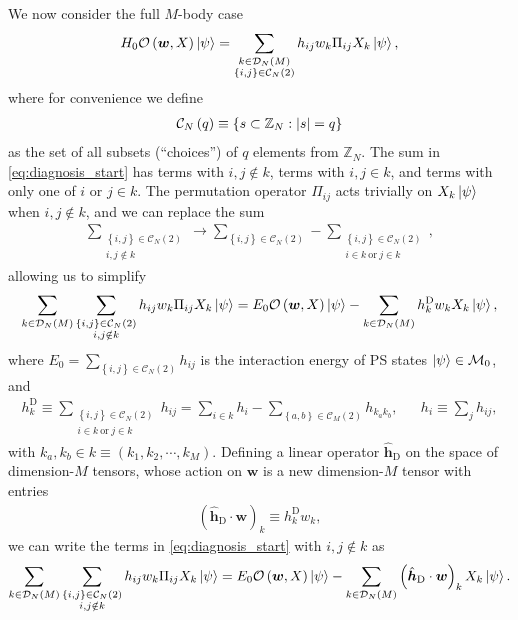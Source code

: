 \documentclass[nofootinbib,notitlepage,11pt]{revtex4-2}
\renewcommand{\t}{\text} %
\newcommand{\p}[1]{\left(#1\right)} %
\renewcommand{\set}[1]{\left\{#1\right\}} %
\renewcommand{\c}{\cdot} %
\newcommand{\m}{\bm} %
\newcommand{\1}{\mathds{1}}
\renewcommand{\i}{\mathrm{i}\mkern1mu}
\newcommand{\C}{\mathcal{C}}
\newcommand{\D}{\mathcal{D}}
\newcommand{\M}{\mathcal{M}}
\renewcommand{\O}{\mathcal{O}}
\newcommand{\ZZ}{\mathbb{Z}}
\begin{document}
We now consider the full $M$-body case
\begin{align}
  H_0 \O\p{\m w,X} \ket\psi
  = \sum_{\substack{k\in\D_N\p{M}\\\set{i,j}\in\C_N\p{2}}}
  h_{ij} w_k \Pi_{ij} X_k \ket\psi,
  \label{eq:diagnosis_start}
\end{align}
where for convenience we define
\begin{align}
  \C_N\p{q} \equiv \set{ s \subset \ZZ_N : \abs{s} = q }
  \label{eq:choices}
\end{align}
as the set of all subsets (``choices'') of $q$ elements from $\ZZ_N$.
The sum in \eqref{eq:diagnosis_start} has terms with $i,j\notin k$,
terms with $i,j\in k$, and terms with only one of $i$ or $j\in k$.
The permutation operator $\Pi_{ij}$ acts trivially on $X_k\ket\psi$
when $i,j\notin k$, and we can replace the sum
\begin{align}
  \sum_{\substack{\set{i,j}\in\C_N\p{2}\\i,j\notin k}}
  \to \sum_{\set{i,j}\in\C_N\p{2}}
  - \sum_{\substack{\set{i,j}\in\C_N\p{2}\\i\in k~\t{or}~j\in k}},
\end{align}
allowing us to simplify
\begin{align}
  \sum_{k\in\D_N\p{M}} \sum_{\substack{\set{i,j}\in\C_N\p{2}\\i,j\notin k}}
  h_{ij} w_k \Pi_{ij} X_k \ket\psi
  = E_0 \O\p{\m w,X} \ket\psi
  - \sum_{k\in\D_N\p{M}} h^{\t{D}}_k w_k X_k \ket\psi,
\end{align}
where $E_0 = \sum_{\set{i,j}\in\C_N\p{2}} h_{ij}$ is the interaction
energy of PS states $\ket\psi\in\M_0$, and
\begin{align}
  h^{\t{D}}_k \equiv
  \sum_{\substack{\set{i,j}\in\C_N\p{2}\\i\in k~\t{or}~j\in k}} h_{ij}
  = \sum_{i\in k} h_i - \sum_{\set{a,b}\in\C_M\p{2}} h_{k_ak_b},
  &&
  h_i \equiv \sum_j h_{ij},
  \label{eq:multi_body_op_diag_element}
\end{align}
with $k_a,k_b\in k\equiv\p{k_1,k_2,\cdots,k_M}$.  Defining a linear
operator $\hat{\m h}_{\t{D}}$ on the space of dimension-$M$ tensors,
whose action on $\m w$ is a new dimension-$M$ tensor with entries
\begin{align}
  \p{\hat{\m h}_{\t{D}}\c\m w}_k \equiv h^{\t{D}}_k w_k,
  \label{eq:multi_body_op_diag}
\end{align}
we can write the terms in \eqref{eq:diagnosis_start} with
$i,j\notin k$ as
\begin{align}
  \sum_{k\in\D_N\p{M}} \sum_{\substack{\set{i,j}\in\C_N\p{2}\\i,j\notin k}}
  h_{ij} w_k \Pi_{ij} X_k \ket\psi
  = E_0 \O\p{\m w,X} \ket\psi
  - \sum_{k\in\D_N\p{M}} \p{\hat{\m h}_{\t{D}}\c\m w}_k X_k \ket\psi.
\end{align}
\end{document}
